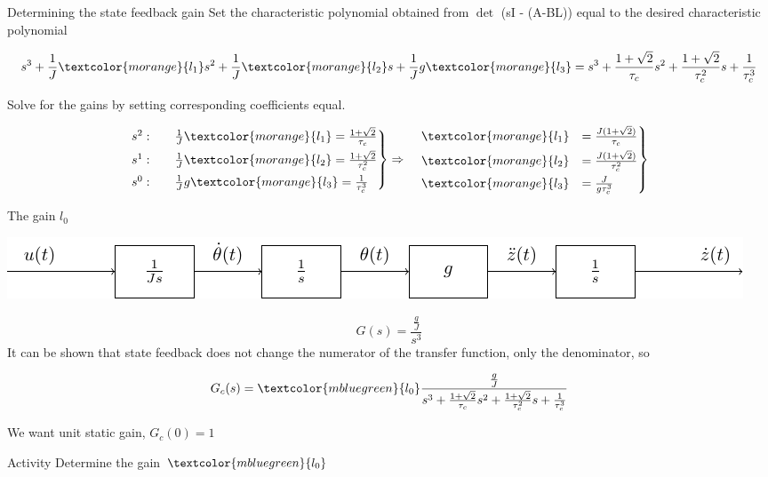 \documentclass[presentation,aspectratio=169]{beamer}
\begin{document}
\begin{frame}[label={sec:org3f7560f}]{Determining the state feedback gain}
Set the characteristic polynomial obtained from \(\det\) \Big(sI - (A-B\textcolor{morange}{L})\Big) equal to the desired characteristic polynomial

\[ s^3 + \frac{1}{J}\textcolor{morange}{l_1}s^2 + \frac{1}{J}\textcolor{morange}{l_2}s + \frac{1}{J}g\textcolor{morange}{l_3} =  s^3 + \frac{1 + \sqrt{2}}{\tau_c}s^2 + \frac{1+\sqrt{2}}{\tau_c^2}s + \frac{1}{\tau_c^3} \]

Solve for the gains by setting corresponding coefficients equal.

\begin{equation*}
\begin{rcases}
s^2: \quad & \frac{1}{J}\textcolor{morange}{l_1} = \frac{1 + \sqrt{2}}{\tau_c}\\
s^1: \quad & \frac{1}{J}\textcolor{morange}{l_2} = \frac{1 + \sqrt{2}}{\tau_c^2}\\
s^0: \quad & \frac{1}{J}g\textcolor{morange}{l_3} = \frac{1}{\tau_c^3}
\end{rcases} \Rightarrow
\begin{rcases}
 \quad \textcolor{morange}{l_1} &= \frac{J(1 + \sqrt{2})}{\tau_c}\\
 \quad \textcolor{morange}{l_2} &= \frac{J(1 + \sqrt{2})}{\tau_c^2}\\
 \quad \textcolor{morange}{l_3} &= \frac{J}{g\tau_c^3}
\end{rcases}
\end{equation*}
\end{frame}


\begin{frame}[label={sec:orge84151d}]{The gain \(l_0\)}
\begin{center}
\includegraphics[width=0.6\linewidth]{../../figures/block-apollo}
\end{center}

\[ G(s) = \frac{\frac{g}{J}}{s^3}\]
It can be shown that state feedback does not change the numerator of the transfer function, only the denominator, so

\[G_c(s) = \textcolor{mbluegreen}{l_0}\frac{\frac{g}{J}}{s^3 + \frac{1 + \sqrt{2}}{\tau_c}s^2 + \frac{1+\sqrt{2}}{\tau_c^2}s + \frac{1}{\tau_c^3}}\]

We want unit static gain,  \(G_c(0) = 1\)

\pause

\alert{Activity} Determine the gain \(\textcolor{mbluegreen}{l_0}\)
\end{frame}
\end{document}
